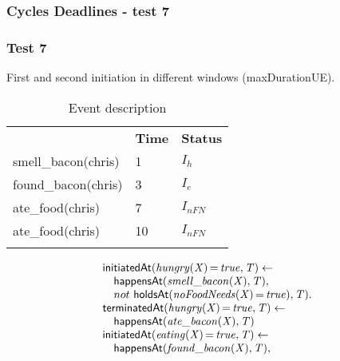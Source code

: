 \documentclass[8pt]{beamer}
\DeclareMathOperator{\val}{=}  %
\def \patsize {}
\def\happensAt{\textsf{\patsize happensAt}}
\def\holdsAt{\textsf{\patsize holdsAt}}
\def\initiatedAt{\textsf{\patsize initiatedAt}}
\def\terminatedAt{\textsf{\patsize terminatedAt}}
\newenvironment{mysplit}%
  {\arraycolsep 0pt \begin{array}{l}}%
  {\end{array}}
\begin{document}
\begin{frame}
    \frametitle{Cycles Deadlines - test 7}
    \subsubsection{Test 7}
    \small
    First and second initiation in different windows (maxDurationUE).\linebreak
    \begin{minipage}{0.4\linewidth}
        \begin{table}[t!]
            \caption{Event description}
            \begin{center}

                \begin{tabular}{lll}
                    \hline\noalign{\smallskip}
                    \multicolumn{1}{l}{\textbf{Event}} & \multicolumn{1}{c}{\textbf{Time}} & \multicolumn{1}{c}{\textbf{Status}} \\
                    smell\_bacon(chris)& 1 & $I_{h}$\\
                    found\_bacon(chris)& 3 & $I_{e}$\\
                    ate\_food(chris)& 7  & $I_{nFN}$\\
                    ate\_food(chris)& 10  & $I_{nFN}$\\
                    \noalign{\smallskip}
                    \hline
                \end{tabular}
            \end{center}
        \end{table}
    \end{minipage}
    \begin{minipage}{0.55\linewidth}
        \begin{align*}
            \begin{mysplit}
                \initiatedAt\mathit{(hungry(X)\val true,T)\leftarrow}\\
                \quad    \happensAt\mathit{(smell\_bacon(X),T),}\\
                \quad    not\ \holdsAt\mathit{(noFoodNeeds(X)\val true),T).}\\
                \terminatedAt\mathit{(hungry(X)\val true,T)\leftarrow}\\
                \quad    \happensAt\mathit{(ate\_bacon(X),T)}\\
                \initiatedAt\mathit{(eating(X)\val true,T)\leftarrow}\\
                \quad    \happensAt\mathit{(found\_bacon(X),T),}\\

\end{mysplit}
\end{align*}
\end{minipage}
\end{frame}
\end{document}

